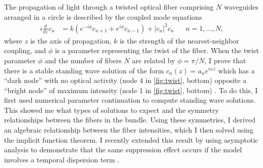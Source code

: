 \documentclass[12pt,reqno,oneside,hidelinks]{article}
\begin{document}
The propagation of light through a twisted optical fiber comprising $N$ waveguides arranged in a circle is described by the coupled mode equations
\begin{align*}
i \frac{d}{dz} c_n &= k \left(e^{-i\phi}c_{n+1} + e^{i\phi}c_{n-1}\right) + |c_n|^2 c_n &&  n = 1, \dots, N,
\end{align*}
where $z$ is the axis of propagation, $k$ is the strength of the nearest-neighbor coupling, and $\phi$ is a parameter representing the twist of the fiber.  When the twist parameter $\phi$ and the number of fibers $N$ are related by $\phi = \pi/N$, I prove that there is a stable standing wave solution of the form $c_n(z) = a_n e^{i \omega z}$ which has a ``dark node'' with no optical activity (node 4 in \cref{fig:twist}, bottom) opposite a ``bright node'' of maximum intensity (node 1 in \cref{fig:twist}, bottom) \cite{ParkerTwist}. To do this, I first used numerical parameter continuation to compute standing wave solutions. This showed me what types of solutions to expect and the symmetry relationships between the fibers in the bundle. Using these symmetries, I derived an algebraic relationship between the fiber intensities, which I then solved using the implicit function theorem. I recently extended this result by using asymptotic analysis to demonstrate that the same suppression effect occurs if the model involves a temporal dispersion term \cite{ParkerSpatiotemporalTwist}.
\end{document}
